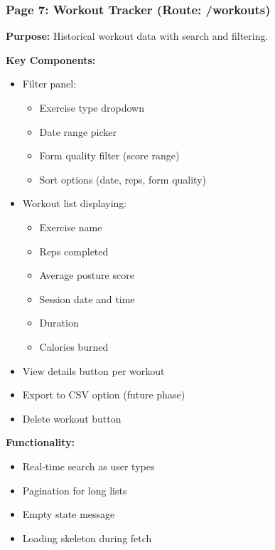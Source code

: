 \documentclass[12pt,a4paper]{article}
\begin{document}
\subsubsection*{Page 7: Workout Tracker (Route: /workouts)}

\textbf{Purpose:} Historical workout data with search and filtering.

\textbf{Key Components:}
\begin{itemize}[noitemsep, topsep=2pt]
  \item Filter panel:
    \begin{itemize}[noitemsep, topsep=0pt]
      \item Exercise type dropdown
      \item Date range picker
      \item Form quality filter (score range)
      \item Sort options (date, reps, form quality)
    \end{itemize}
  \item Workout list displaying:
    \begin{itemize}[noitemsep, topsep=0pt]
      \item Exercise name
      \item Reps completed
      \item Average posture score
      \item Session date and time
      \item Duration
      \item Calories burned
    \end{itemize}
  \item View details button per workout
  \item Export to CSV option (future phase)
  \item Delete workout button
\end{itemize}

\textbf{Functionality:}
\begin{itemize}[noitemsep, topsep=2pt]
  \item Real-time search as user types
  \item Pagination for long lists
  \item Empty state message
  \item Loading skeleton during fetch
\end{itemize}

\vspace{0.5cm}
\noindent{}
\vspace{1cm}
\end{document}
